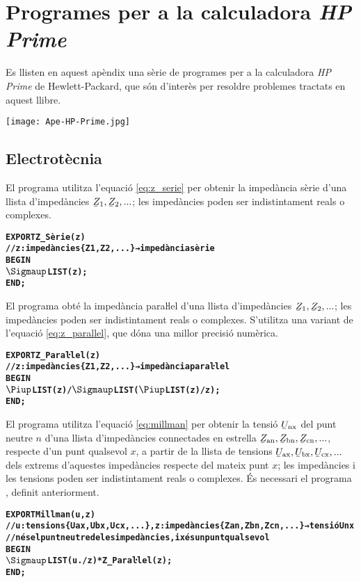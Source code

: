 \chapter{Programes per a la calculadora \emph{HP Prime}}

Es llisten en aquest apèndix una sèrie de programes per a la calculadora \emph{HP Prime} de Hewlett-Packard, que són d'interès per resoldre problemes tractats en aquest llibre.

\begin{center}
\texttt{[image: Ape-HP-Prime.jpg]}
\end{center}

\section{Electrotècnia}\label{sec:HP_ELC}

El programa  utilitza l'equació \eqref{eq:z_serie} per obtenir la impedància sèrie d'una llista d'impedàncies $\cmplx{Z}_1, \cmplx{Z}_2, ...$; les impedàncies poden ser indistintament reals o complexes.
\vspace{-6mm}
\begin{alltt}
\bfseries
{}
    EXPORT Z_Sèrie(z)
    // z:impedàncies \{Z1, Z2, ...\} → impedància sèrie
    BEGIN
      \(\Sigmaup\)LIST(z);
    END;
\end{alltt}


El programa  obté la impedància paraŀlel  d'una llista d'impedàncies $\cmplx{Z}_1, \cmplx{Z}_2, ...$; les impedàncies poden ser indistintament reals o complexes. S'utilitza una variant de l'equació \eqref{eq:z_parallel}, que dóna una millor precisió numèrica.
\vspace{-6mm}
\begin{alltt}
\bfseries
{}
    EXPORT Z_Paraŀlel(z)
    // z:impedàncies \{Z1, Z2, ...\} → impedància paraŀlel
    BEGIN
      \(\Piup\)LIST(z)/\(\Sigmaup\)LIST(\(\Piup\)LIST(z)/z);
    END;
\end{alltt}

El programa  utilitza l'equació \eqref{eq:millman} per obtenir la tensió $\cmplx{U}\ped{nx}$ del punt neutre $n$ d'una llista d'impedàncies connectades en estrella $\cmplx{Z}\ped{an}, \cmplx{Z}\ped{bn}, \cmplx{Z}\ped{cn}, ...$, respecte d'un punt qualsevol $x$, a partir de la llista de tensions $\cmplx{U}\ped{ax}, \cmplx{U}\ped{bx}, \cmplx{U}\ped{cx}, ...$ dels extrems d'aquestes impedàncies respecte del mateix punt $x$; les impedàncies i les tensions poden ser indistintament reals o complexes. És necessari el programa , definit anteriorment.
\vspace{-6mm}
\begin{alltt}
\bfseries
{}
    EXPORT Millman(u,z)
    // u:tensions \{Uax,Ubx,Ucx,...\}, z:impedàncies \{Zan,Zbn,Zcn,...\} → tensió Unx
    // n és el punt neutre de les impedàncies, i x és un punt qualsevol
    BEGIN
      \(\Sigmaup\)LIST(u ./ z) * Z_Paraŀlel(z);
    END;
\end{alltt}


